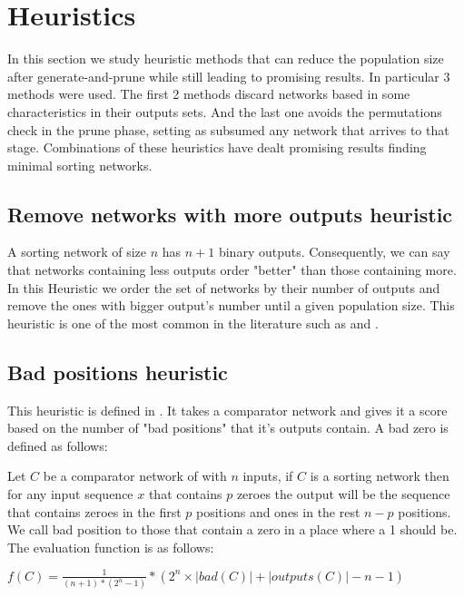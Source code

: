 \documentclass[../main.tex]{subfiles}
\begin{document}
	\section{Heuristics}
	In this section we study heuristic methods that can reduce the population size after generate-and-prune while still leading to promising results. In particular 3 methods were used. The first 2 methods discard networks based in some characteristics in their outputs sets. And the last one avoids the permutations check in the prune phase, setting as subsumed any network that arrives to that stage. Combinations of these heuristics have dealt promising results finding minimal sorting networks.
	
	\subsection{Remove networks with more outputs heuristic}
	A sorting network of size $n$ has $n+1$ binary outputs. Consequently, we can say that networks containing less outputs order "better" than those containing more. In this Heuristic we order the set of networks by their number of outputs and remove the ones with bigger output's number until a given population size. This heuristic is one of the most common in the literature such as \cite{Sekanina2005} and \cite{SortingNetworkIsomorphism}.
	
	\subsection{Bad positions heuristic}
	This heuristic is defined in \cite{FRASINARU2019447}. It takes a comparator network and gives it a score based on the number of "bad positions" that it's outputs contain. A bad zero is defined as follows:
	
	Let $C$ be a comparator network of with $n$ inputs, if $C$ is a sorting network then for any input sequence $x$ that contains $p$ zeroes the output will be the sequence that contains zeroes in the first $p$ positions and ones in the rest $n-p$ positions. We call bad position to those that contain a zero in a place where a 1 should be. The evaluation function is as follows:
	
	$f(C)=\frac{1}{(n+1)*(2^n-1)}*(2^n \times |bad(C)| + |outputs(C)| - n -1)$
	
\end{document}
